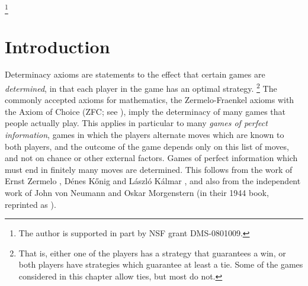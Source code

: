 \documentclass{book}%
\begin{document}
\thanks{
The author is supported in part by NSF grant DMS-0801009.}




\section{Introduction}

Determinacy axioms are statements to the effect that certain games
are \emph{determined}, in that each player in the game has an
optimal strategy.
\footnote{That is, either one of the players has a strategy that guarantees a win, or both players
have strategies which guarantee at least a tie. Some of the games considered in this chapter allow
ties, but most do not.}
The commonly accepted axioms for mathematics, the
Zermelo-Fraenkel axioms with the Axiom of Choice (ZFC; see
\cite{Jech:settheory, Kunen}), imply the determinacy of many games
that people actually play.
This applies in particular to many \emph{games of perfect
information}, games in which the players alternate moves which are known to both players, and the
outcome of the game depends only on this list of moves, and not on chance or other external factors. Games of perfect
information which must end in finitely many moves are determined. This follows from the
work of Ernst Zermelo ,
D\'{e}nes K\H{o}nig  and L\'{a}szl\'{o} K\'{a}lmar , and also from the independent work  of John von Neumann and Oskar Morgenstern (in their 1944 book, reprinted as ).
\end{document}
